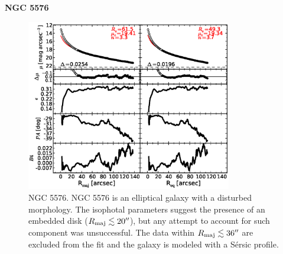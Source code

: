 \documentclass[preprint2]{emulateapj}
\newcommand{\fitfigurewidth}{0.8\textwidth}
\begin{document}
  \clearpage\newpage\noindent

  {\bf NGC 5576 \\}

  \begin{figure}[h]
  \begin{center}
  \includegraphics[width=\fitfigurewidth]{images/n5576_1Dfit.eps}
  \caption{NGC 5576.
  NGC 5576 is an elliptical galaxy with a disturbed morphology. 
  The isophotal parameters suggest the presence of an embedded disk ($R_{\rm maj} \lesssim 20''$), 
  but any attempt to account for such component was unsuccessful. 
  The data within $R_{\rm maj} \lesssim 36''$ are excluded from the fit 
  and the galaxy is modeled with a S\'ersic profile.
  } 
  \end{center}
  \end{figure}
  
\end{document}
